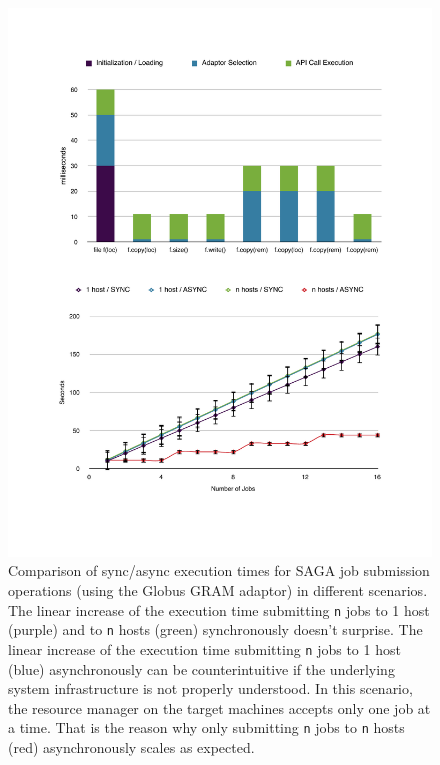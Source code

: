 \begin{figure}[!ht]
  \begin{center}
      \includegraphics[width=1\textwidth]{../figures/perf_async_1.pdf}
  \end{center}
 \up\up\up\up\up
  \caption{\small Comparison of sync/async execution times for SAGA job submission operations (using the Globus GRAM adaptor) in different scenarios. The linear increase of the execution time submitting \texttt{n} jobs to 1 host (purple) and to \texttt{n} hosts (green) synchronously doesn't surprise. The linear increase of the execution time submitting \texttt{n} jobs to 1 host (blue) asynchronously can be counterintuitive if the underlying system infrastructure is not properly understood. In this scenario, the resource manager on the target machines accepts only one job at a time. That is the reason why only submitting \texttt{n} jobs to \texttt{n} hosts (red) asynchronously scales as expected.}
 \label{fig_perf_async}
\end{figure}

